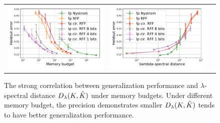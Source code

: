 \begin{figure}
\begin{tabular}{c c c}
		\includegraphics[width=0.33\linewidth]{figures/classification_acc_vs_mem.pdf} &
		\includegraphics[width=0.33\linewidth]{figures/classification_acc_vs_delta.pdf} \\
	\end{tabular}
	\caption{The strong correlation between generalization performance and $\lambda$-spectral distance $D_{\lambda}(K,\tilde{K})$ under memory budgets. Under different memory budget, the precision demonstrates smaller $D_{\lambda}(K,\tilde{K})$ tends to have better generalization performance.}
	\label{fig:specdist}
\end{figure}

